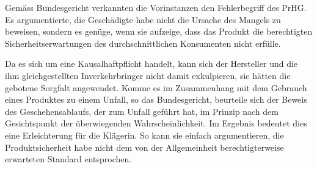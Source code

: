 Gemäss Bundesgericht verkannten die Vorinstanzen den Fehlerbegriff des PrHG. Es argumentierte, die Geschädigte habe nicht die Ursache des Mangels zu beweisen, sondern es genüge, wenn sie aufzeige, dass das Produkt die berechtigten Sicherheitserwartungen des durchschnittlichen Konsumenten nicht erfülle. 

Da es sich um eine Kausalhaftpflicht handelt, kann sich der Hersteller und die ihm gleichgestellten Inverkehrbringer nicht damit exkulpieren, sie hätten die gebotene Sorgfalt angewendet. 
Komme es im Zusammenhang mit dem Gebrauch eines Produktes zu einem Unfall, so das Bundesgericht, beurteile sich der Beweis des Geschehensablaufs, der zum Unfall geführt hat, im Prinzip nach dem Gesichtspunkt der überwiegenden Wahrscheinlichkeit.
Im Ergebnis bedeutet dies eine Erleichterung für die Klägerin. So kann sie einfach argumentieren, die Produktsicherheit habe nicht dem von der Allgemeinheit berechtigterweise erwarteten Standard
entsprochen.
